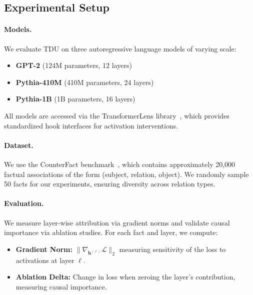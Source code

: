 \label{sec:experiments}

\subsection{Experimental Setup}
\label{sec:exp_setup}

\paragraph{Models.}
We evaluate TDU on three autoregressive language models of varying scale:
\begin{itemize}
    \item \textbf{GPT-2} (124M parameters, 12 layers)~\citep{radford2019language}
    \item \textbf{Pythia-410M} (410M parameters, 24 layers)~\citep{biderman2023pythia}
    \item \textbf{Pythia-1B} (1B parameters, 16 layers)~\citep{biderman2023pythia}
\end{itemize}
All models are accessed via the TransformerLens library~\citep{nanda2023transformerlens}, which provides standardized hook interfaces for activation interventions.

\paragraph{Dataset.}
We use the CounterFact benchmark~\citep{meng2022locating}, which contains approximately 20,000 factual associations of the form (subject, relation, object). We randomly sample 50 facts for our experiments, ensuring diversity across relation types.

\paragraph{Evaluation.}
We measure layer-wise attribution via gradient norms and validate causal importance via ablation studies. For each fact and layer, we compute:
\begin{itemize}
    \item \textbf{Gradient Norm:} $\|\nabla_{\mathbf{h}^{(\ell)}} \mathcal{L}\|_2$ measuring sensitivity of the loss to activations at layer $\ell$.
    \item \textbf{Ablation Delta:} Change in loss when zeroing the layer's contribution, measuring causal importance.
\end{itemize}

